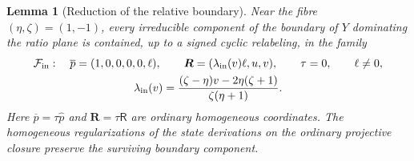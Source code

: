 \documentclass[11pt,a4paper]{article}
\numberwithin{equation}{section}
\theoremstyle{plain}
\newtheorem{lemma}[theorem]{Lemma}
\theoremstyle{definition}
\theoremstyle{remark}
\begin{document}
\begin{lemma}[Reduction of the relative boundary]\label{r3:boundaryreduction}
Near the fibre $(\eta,\zeta)=(1,-1)$, every irreducible component
of the boundary of $Y$ dominating the ratio plane is contained,
up to a signed cyclic relabeling, in the family
\begin{equation}\label{r3:incomingfamily}
\begin{gathered}
 \mathcal F_{\rm in}:\quad
 \overline p=(1,0,0,0,0,\ell),\qquad
 \boldsymbol R=(\lambda_{\mathrm{in}}(v)\ell,u,v),\qquad
 \tau=0,\qquad \ell\ne0,\\
 \lambda_{\mathrm{in}}(v)=
 \frac{(\zeta-\eta)v-2\eta(\zeta+1)}{\zeta(\eta+1)}.
\end{gathered}
\end{equation}
Here $\overline p=\tau\widehat p$ and
$\boldsymbol R=\tau\mathsf R$ are ordinary homogeneous coordinates.
The homogeneous regularizations of the state derivations on the
ordinary projective closure preserve the surviving boundary component.
\end{lemma}
\end{document}
